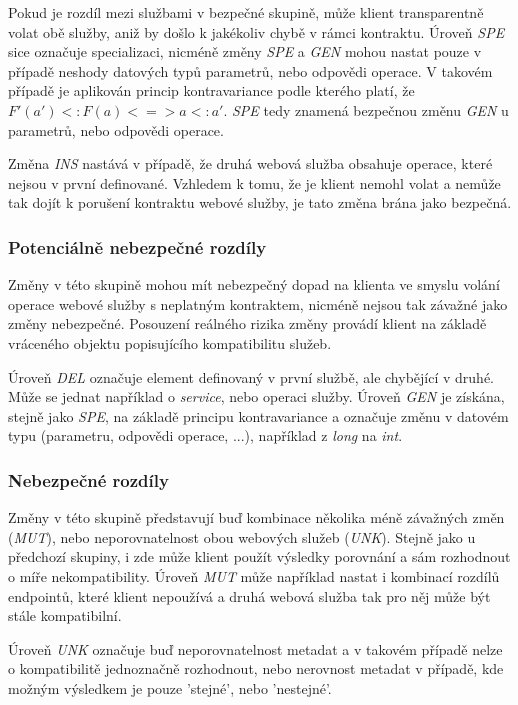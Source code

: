 \documentclass[czech,DP]{thesiskiv}
\begin{document}
Pokud je rozdíl mezi službami v bezpečné skupině, může klient transparentně volat obě služby, aniž by došlo k jakékoliv chybě v rámci kontraktu. Úroveň \textit{SPE} sice označuje specializaci, nicméně změny \textit{SPE} a \textit{GEN} mohou nastat pouze v případě neshody datových typů parametrů, nebo odpovědi operace. V takovém případě je aplikován princip kontravariance \cite{abadi1995subytping} podle kterého platí, že $F'(a') <: F(a) <=> a <: a'$. \textit{SPE} tedy znamená bezpečnou změnu \textit{GEN} u parametrů, nebo odpovědi operace. 

Změna \textit{INS} nastává v případě, že druhá webová služba obsahuje operace, které nejsou v první definované. Vzhledem k tomu, že je klient nemohl volat a nemůže tak dojít k porušení kontraktu webové služby, je tato změna brána jako bezpečná.

\subsubsection{Potenciálně nebezpečné rozdíly}

Změny v této skupině mohou mít nebezpečný dopad na klienta ve smyslu volání operace webové služby s neplatným kontraktem, nicméně nejsou tak závažné jako změny nebezpečné. Posouzení reálného rizika změny provádí klient na základě vráceného objektu popisujícího kompatibilitu služeb.

Úroveň \textit{DEL} označuje element definovaný v první službě, ale chybějící v druhé. Může se jednat například o \textit{service}, nebo operaci služby. Úroveň \textit{GEN} je získána, stejně jako \textit{SPE}, na základě principu kontravariance a označuje změnu v datovém typu (parametru, odpovědi operace, ...), například z \textit{long} na \textit{int}. 

\subsubsection{Nebezpečné rozdíly}

Změny v této skupině představují buď kombinace několika méně závažných změn (\textit{MUT}), nebo neporovnatelnost obou webových služeb (\textit{UNK}). Stejně jako u předchozí skupiny, i zde může klient použít výsledky porovnání a sám rozhodnout o míře nekompatibility. Úroveň \textit{MUT} může například nastat i kombinací rozdílů endpointů, které klient nepoužívá a druhá webová služba tak pro něj může být stále kompatibilní.

Úroveň \textit{UNK} označuje buď neporovnatelnost metadat a v takovém případě nelze o kompatibilitě jednoznačně rozhodnout, nebo nerovnost metadat v případě, kde možným výsledkem je pouze 'stejné', nebo 'nestejné'.
\end{document}

